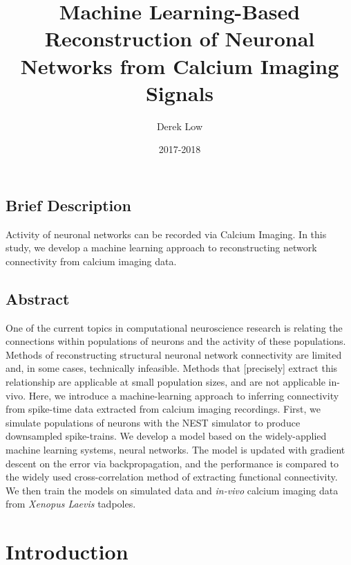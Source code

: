 \documentclass[11pt]{article}
\title{Machine Learning-Based Reconstruction of Neuronal Networks from Calcium Imaging Signals}
\author{Derek Low}
\date{2017-2018}
\begin{document}
\maketitle

\subsection{Brief Description}
Activity of neuronal networks can be recorded via Calcium Imaging. In this study, we develop a machine learning approach to reconstructing network connectivity from calcium imaging data.

\subsection{Abstract}
One of the current topics in computational neuroscience research is relating the connections within populations of neurons and the activity of these populations. Methods of reconstructing structural neuronal network connectivity are limited and, in some cases, technically infeasible. Methods that [precisely] extract this relationship are applicable at small population sizes, and are not applicable in-vivo. Here, we introduce a machine-learning approach to inferring connectivity from spike-time data extracted from calcium imaging recordings. First, we simulate populations of neurons with the NEST simulator to produce downsampled spike-trains. We develop a model based on the widely-applied machine learning systems, neural networks. The model is updated with gradient descent on the error via backpropagation, and the performance is compared to the widely used cross-correlation method of extracting functional connectivity. We then train the models on simulated data and \textit{in-vivo} calcium imaging data from \textit{Xenopus Laevis} tadpoles.


\section{Introduction}
\end{document}
